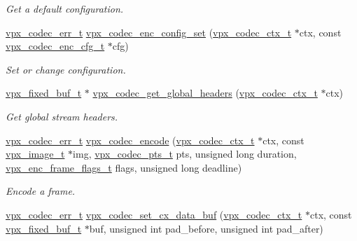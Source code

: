 \begin{DoxyCompactItemize}
\begin{DoxyCompactList}\small\item\em Get a default configuration. \end{DoxyCompactList}\item 
\hyperlink{group__codec_gada1084710837ad363b92f2379dd2b8d2}{vpx\+\_\+codec\+\_\+err\+\_\+t} \hyperlink{group__encoder_gabbc036b1fbc1288485df5562a989da9b}{vpx\+\_\+codec\+\_\+enc\+\_\+config\+\_\+set} (\hyperlink{group__codec_gad03e2dfa6ae511db7d25be6bbb336233}{vpx\+\_\+codec\+\_\+ctx\+\_\+t} $\ast$ctx, const \hyperlink{group__encoder_ga946236c809e493b31a815d82db1e59db}{vpx\+\_\+codec\+\_\+enc\+\_\+cfg\+\_\+t} $\ast$cfg)
\begin{DoxyCompactList}\small\item\em Set or change configuration. \end{DoxyCompactList}\item 
\hyperlink{group__encoder_ga21fab7dd28065f349c97165501223764}{vpx\+\_\+fixed\+\_\+buf\+\_\+t} $\ast$ \hyperlink{group__encoder_ga512eb105fef18bebb02e134e4cbc82ff}{vpx\+\_\+codec\+\_\+get\+\_\+global\+\_\+headers} (\hyperlink{group__codec_gad03e2dfa6ae511db7d25be6bbb336233}{vpx\+\_\+codec\+\_\+ctx\+\_\+t} $\ast$ctx)
\begin{DoxyCompactList}\small\item\em Get global stream headers. \end{DoxyCompactList}\item 
\hyperlink{group__codec_gada1084710837ad363b92f2379dd2b8d2}{vpx\+\_\+codec\+\_\+err\+\_\+t} \hyperlink{group__encoder_gaf990542e2aeb389f05fae3e9c7803639}{vpx\+\_\+codec\+\_\+encode} (\hyperlink{group__codec_gad03e2dfa6ae511db7d25be6bbb336233}{vpx\+\_\+codec\+\_\+ctx\+\_\+t} $\ast$ctx, const \hyperlink{vpx__image_8h_abf5ac962cc6d71b4f0e39b1b0d033e55}{vpx\+\_\+image\+\_\+t} $\ast$img, \hyperlink{group__encoder_ga7e711b0a71c65aef8f0faea8bd57b05f}{vpx\+\_\+codec\+\_\+pts\+\_\+t} pts, unsigned long duration, \hyperlink{group__encoder_ga99e4a3c966f0de19fe1aa626bd860366}{vpx\+\_\+enc\+\_\+frame\+\_\+flags\+\_\+t} flags, unsigned long deadline)
\begin{DoxyCompactList}\small\item\em Encode a frame. \end{DoxyCompactList}\item 
\hyperlink{group__codec_gada1084710837ad363b92f2379dd2b8d2}{vpx\+\_\+codec\+\_\+err\+\_\+t} \hyperlink{group__encoder_gae9f8f75978a1ebcf1f358964b55ecb9e}{vpx\+\_\+codec\+\_\+set\+\_\+cx\+\_\+data\+\_\+buf} (\hyperlink{group__codec_gad03e2dfa6ae511db7d25be6bbb336233}{vpx\+\_\+codec\+\_\+ctx\+\_\+t} $\ast$ctx, const \hyperlink{group__encoder_ga21fab7dd28065f349c97165501223764}{vpx\+\_\+fixed\+\_\+buf\+\_\+t} $\ast$buf, unsigned int pad\+\_\+before, unsigned int pad\+\_\+after)

\end{DoxyCompactItemize}
